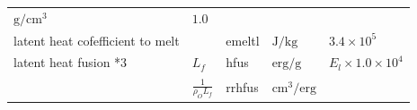 \begin{longtable}[]{@{}lllll@{}}
\begin{minipage}[t]{0.12\columnwidth}
\(\mathrm{g/cm^3}\)\strut
\end{minipage} & \begin{minipage}[t]{0.17\columnwidth}\raggedright
\(1.0\)\strut
\end{minipage}\tabularnewline
\begin{minipage}[t]{0.33\columnwidth}\raggedright
latent heat cofefficient to melt\strut
\end{minipage} & \begin{minipage}[t]{0.19\columnwidth}\raggedright
\strut
\end{minipage} & \begin{minipage}[t]{0.06\columnwidth}\raggedright
emeltl\strut
\end{minipage} & \begin{minipage}[t]{0.12\columnwidth}\raggedright
\(\mathrm{J/kg}\)\strut
\end{minipage} & \begin{minipage}[t]{0.17\columnwidth}\raggedright
\(3.4 \times 10^5\)\strut
\end{minipage}\tabularnewline
\begin{minipage}[t]{0.33\columnwidth}\raggedright
latent heat fusion *3\strut
\end{minipage} & \begin{minipage}[t]{0.19\columnwidth}\raggedright
\(L_f\)\strut
\end{minipage} & \begin{minipage}[t]{0.06\columnwidth}\raggedright
hfus\strut
\end{minipage} & \begin{minipage}[t]{0.12\columnwidth}\raggedright
\(\mathrm{erg/g}\)\strut
\end{minipage} & \begin{minipage}[t]{0.17\columnwidth}\raggedright
\(E_l \times 1.0 \times 10^4\)\strut
\end{minipage}\tabularnewline
\begin{minipage}[t]{0.33\columnwidth}\raggedright
\strut
\end{minipage} & \begin{minipage}[t]{0.19\columnwidth}\raggedright
\(\frac{1}{\rho_O L_f}\)\strut
\end{minipage} & \begin{minipage}[t]{0.06\columnwidth}\raggedright
rrhfus\strut
\end{minipage} & \begin{minipage}[t]{0.12\columnwidth}\raggedright
\(\mathrm{cm^3/erg}\)\strut
\end{minipage} & \begin{minipage}[t]{0.17\columnwidth}\raggedright

\end{minipage}
\end{longtable}
